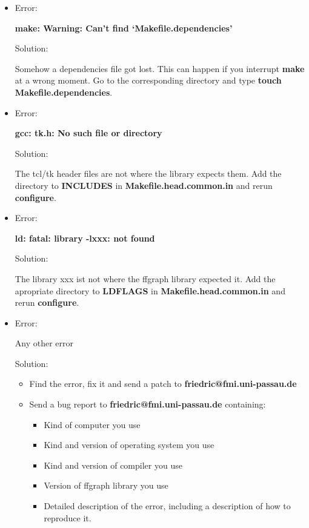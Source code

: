 \begin{itemize}

\item 

Error:

{\bf make: Warning: Can't find `Makefile.dependencies'}

Solution:

Somehow a dependencies file got lost. This can happen if you interrupt
{\bf make} at a wrong moment. Go to the corresponding directory and
type {\bf touch Makefile.dependencies}.

\item 

Error:

{\bf gcc: tk.h: No such file or directory}

Solution:

The tcl/tk header files are not where the library expects them. Add
the directory to {\bf INCLUDES} in {\bf Makefile.head.common.in} and
rerun {\bf configure}.

\item

Error:

{\bf ld: fatal: library -lxxx: not found}

Solution:

The library xxx ist not where the ffgraph library expected it. Add the
apropriate directory to {\bf LDFLAGS} in {\bf Makefile.head.common.in} and
rerun {\bf configure}.

\item

Error:

Any other error

Solution:

\begin{itemize}
\item Find the error, fix it and send a patch to {\bf
friedric{@}fmi.uni-passau.de}

\item Send a bug report to {\bf
friedric{@}fmi.uni-passau.de} containing:

\begin{itemize}
\item Kind of computer you use
\item Kind and version of operating system you use
\item Kind and version of compiler you use
\item Version of ffgraph library you use
\item Detailed description of the error, including a description of
how to reproduce it.

\end{itemize}
\end{itemize}
\end{itemize}
